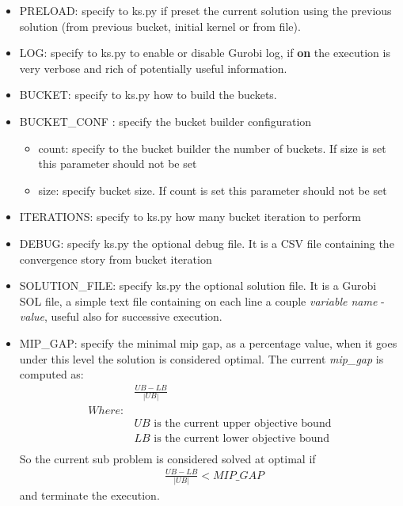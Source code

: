         \begin{itemize}
            \item PRELOAD: specify to ks.py if preset the current solution using the previous solution (from  previous bucket, initial kernel or from file).
            \item LOG: specify to ks.py to enable or disable Gurobi log, if \textbf{on} the execution is very verbose and rich of potentially useful information.
            \item BUCKET: specify to ks.py how to build the buckets.
            \item BUCKET\_CONF : specify the bucket builder configuration
            \begin{itemize}
               \item count: specify to the bucket builder the number of buckets. If size is set this parameter should not be set
               \item size: specify bucket size. If count is set this parameter should not be set 
            \end{itemize}
            \item ITERATIONS: specify to ks.py how many bucket iteration to perform
            \item DEBUG: specify ks.py the optional debug file. It is a CSV file containing the convergence story from bucket iteration
            \item SOLUTION\_FILE: specify ks.py the optional solution file. It is a Gurobi SOL file, a simple text file containing on each line
            a couple \emph{variable name} - \emph{value}, useful also for successive execution.
            \item MIP\_GAP: specify the minimal mip gap, as a percentage value, when it goes under this level the solution is considered optimal. The current \emph{mip\_gap}
            is computed as:
            \begin{align*}
                &\frac{UB - LB}{|UB|}\\
                Where:&\\
                &UB \text{ is the current upper objective bound}\\
                &LB \text{ is the current lower objective bound}\\
            \end{align*} 
            So the current sub problem is considered solved at optimal if
            \begin{align*}
                &\frac{UB - LB}{|UB|} < MIP\_GAP
            \end{align*} 
            and terminate the execution.


\end{itemize}
